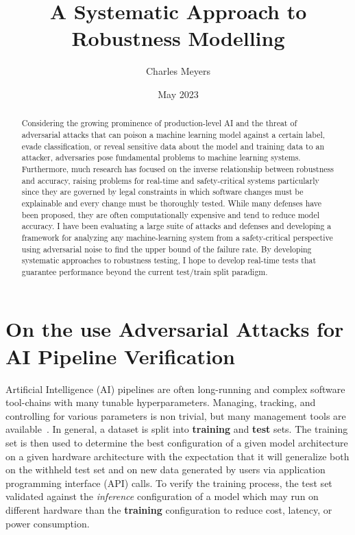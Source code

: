 \documentclass[conference]{IEEEtran}
\title{A Systematic Approach to Robustness Modelling}
\author[1]{Charles Meyers}
\affil[1]{Department of Computing Science, Umeå University, Umeå, Sweden}
\date{May 2023}
\begin{document}
\maketitle
\begin{abstract}
    Considering the growing prominence of production-level AI and the threat of adversarial attacks that can poison a machine learning model against a certain label, evade classification, or reveal sensitive data about the model and training data to an attacker, adversaries pose fundamental problems to machine learning systems. Furthermore, much research has focused on the inverse relationship between robustness and accuracy, raising problems for real-time and safety-critical systems particularly since they are governed by legal constraints in which software changes must be explainable and every change must be thoroughly tested. While many defenses have been proposed, they are often computationally expensive and tend to reduce model accuracy. I have been evaluating a large suite of attacks and defenses and developing a framework for analyzing any machine-learning system from a safety-critical perspective using adversarial noise to find the upper bound of the failure rate. By developing systematic approaches to robustness testing, I hope to develop real-time tests that guarantee performance beyond the current test/train split paradigm.
\end{abstract}


\section{On the use Adversarial Attacks for AI Pipeline Verification }

Artificial Intelligence (AI) pipelines are often long-running and complex software tool-chains with many tunable hyperparameters. Managing, tracking, and controlling for various parameters is non trivial, but many management tools are available~\cite{dvc, hydra, k8s}. In general, a dataset is split into \textbf{training} and \textbf{test} sets. The training set is then used to determine the best configuration of a given model architecture on a given hardware architecture with the expectation that it will generalize both on the withheld test set and on new data generated by users via application programming interface (API) calls. To verify the training process, the test set validated against the \textit{inference} configuration of a model which may run on different hardware than the \textbf{training} configuration to reduce cost, latency, or power consumption.
\end{document}
